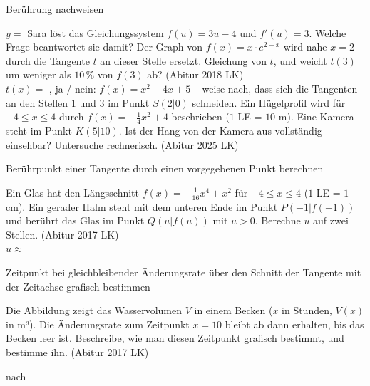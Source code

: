 \begin{aufgabe}{Berührung nachweisen}
\begin{teile}
\begin{ksys}[xmin=-4,xmax=4,ymin=-2,ymax=6]   \end{ksys}
$y =$ \leerfeld
\teil Sara löst das Gleichungssystem $f(u) = 3u - 4$ und $f'(u) = 3$. Welche Frage beantwortet sie damit?
\teil Der Graph von $f(x) = x \cdot e^{2 - x}$ wird nahe $x = 2$ durch die Tangente $t$ an dieser Stelle ersetzt. Gleichung von $t$, und weicht $t(3)$ um weniger als $10\,\%$ von $f(3)$ ab? \hfill (Abitur 2018 LK) \\ $t(x) =$ \leerfeld , ja / nein: \leerfeld
\teil $f(x) = x^2 - 4x + 5$ – weise nach, dass sich die Tangenten an den Stellen $1$ und $3$ im Punkt $S(2 | 0)$ schneiden.
\teil Ein Hügelprofil wird für $-4 \le x \le 4$ durch $f(x) = -\frac{1}{4}x^2 + 4$ beschrieben ($1$ LE = $10$ m). Eine Kamera steht im Punkt $K(5 | 10)$. Ist der Hang von der Kamera aus vollständig einsehbar? Untersuche rechnerisch. \hfill (Abitur 2025 LK) \\ \leerfeld
\end{teile}
\end{aufgabe}

\begin{aufgabe}{Berührpunkt einer Tangente durch einen vorgegebenen Punkt berechnen}
\begin{teile}
\teil Ein Glas hat den Längsschnitt $f(x) = -\frac{1}{16}x^4 + x^2$ für $-4 \le x \le 4$ ($1$ LE = $1$ cm). Ein gerader Halm steht mit dem unteren Ende im Punkt $P(-1 | f(-1))$ und berührt das Glas im Punkt $Q(u | f(u))$ mit $u > 0$. Berechne $u$ auf zwei Stellen. \hfill (Abitur 2017 LK) \\ $u \approx$ \leerfeld
\end{teile}
\end{aufgabe}

\begin{aufgabe}{Zeitpunkt bei gleichbleibender Änderungsrate über den Schnitt der Tangente mit der Zeitachse grafisch bestimmen}
\begin{teile}
\teil Die Abbildung zeigt das Wasservolumen $V$ in einem Becken ($x$ in Stunden, $V(x)$ in m³). Die Änderungsrate zum Zeitpunkt $x = 10$ bleibt ab dann erhalten, bis das Becken leer ist. Beschreibe, wie man diesen Zeitpunkt grafisch bestimmt, und bestimme ihn. \hfill (Abitur 2017 LK) \\

\begin{ksys}[xmin=0,xmax=30,ymin=0,ymax=45,xstep=5,ystep=5,xlabel=x in h,ylabel=V in m³,ablesen]  \end{ksys}
nach \leerfeld[h]
\end{teile}
\end{aufgabe}


